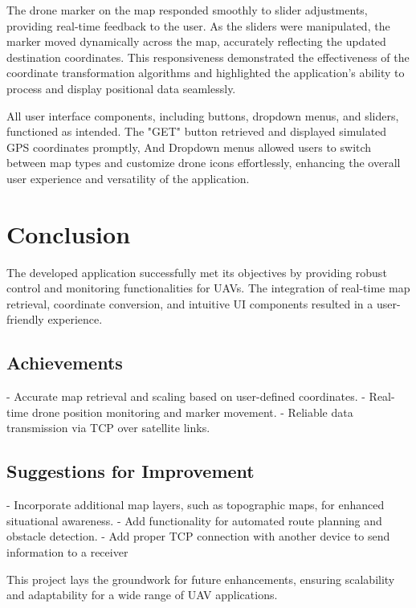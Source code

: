 \documentclass[conference]{IEEEtran}
\begin{document}
The drone marker on the map responded smoothly to slider adjustments, providing real-time feedback to the user. As the sliders were manipulated, the marker moved dynamically across the map, accurately reflecting the updated destination coordinates. This responsiveness demonstrated the effectiveness of the coordinate transformation algorithms and highlighted the application's ability to process and display positional data seamlessly.

All user interface components, including buttons, dropdown menus, and sliders, functioned as intended. The "GET" button retrieved and displayed simulated GPS coordinates promptly, And Dropdown menus allowed users to switch between map types and customize drone icons effortlessly, enhancing the overall user experience and versatility of the application.



\section{Conclusion}


The developed application successfully met its objectives by providing robust control and monitoring functionalities for UAVs. The integration of real-time map retrieval, coordinate conversion, and intuitive UI components resulted in a user-friendly experience.

\subsection{Achievements}
- Accurate map retrieval and scaling based on user-defined coordinates.
- Real-time drone position monitoring and marker movement.
- Reliable data transmission via TCP over satellite links.

\subsection{Suggestions for Improvement}
- Incorporate additional map layers, such as topographic maps, for enhanced situational awareness.
- Add functionality for automated route planning and obstacle detection.
- Add proper TCP connection with another device to send information to a receiver

This project lays the groundwork for future enhancements, ensuring scalability and adaptability for a wide range of UAV applications.
\end{document}
